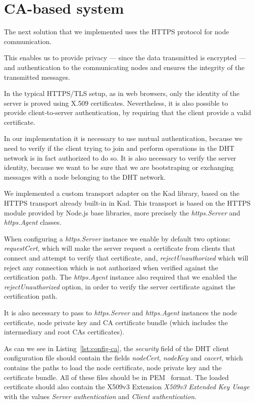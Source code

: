 \section{CA-based system}\label{implementation:ca-based}

The next solution that we implemented uses the HTTPS protocol for node communication.

This enables us to provide privacy — since the data transmitted is encrypted — and authentication to the communicating nodes and ensures the integrity of the transmitted messages.

In the typical HTTPS/TLS setup, as in web browsers, only the identity of the server is proved using X.509 certificates.
Nevertheless, it is also possible to provide client-to-server authentication, by requiring that the client provide a valid certificate.

In our implementation it is necessary to use mutual authentication, because we need to verify if the client trying to join and perform operations in the DHT network is in fact authorized to do so.
It is also necessary to verify the server identity, because we want to be sure that we are bootstraping or exchanging messages with a node belonging to the DHT network.

We implemented a custom transport adapter on the Kad library, based on the HTTPS transport already built-in in Kad.
This transport is based on the HTTPS module provided by Node.js base libraries, more precisely the \textit{https.Server} and \textit{https.Agent} classes.

When configuring a \textit{https.Server} instance we enable by default two options: \textit{requestCert}, which will make the server request a certificate from clients that connect and attempt to verify that certificate, and, \textit{rejectUnauthorized} which will reject any connection which is not authorized when verified against the certification path.
The \textit{https.Agent} instance also required that we enabled the \textit{rejectUnauthorized} option, in order to verify the server certificate against the certification path.

It is also necessary to pass to \textit{https.Server} and \textit{https.Agent} instances the node certificate, node private key and CA certificate bundle (which includes the intermediary and root CAs certificates).

As can we see in Listing~\ref{lst:config-ca}, the \textit{security} field of the DHT client configuration file should contain the fields \textit{nodeCert}, \textit{nodeKey} and \textit{cacert}, which contains the paths to load the node certificate, node private key and the certificate bundle.
All of these files should be in \ac{PEM}~\cite{rfc1421} format.
The loaded certificate should also contain the X509v3 Extension \textit{X509v3 Extended Key Usage} with the values \textit{Server authentication} and \textit{Client authentication}.

